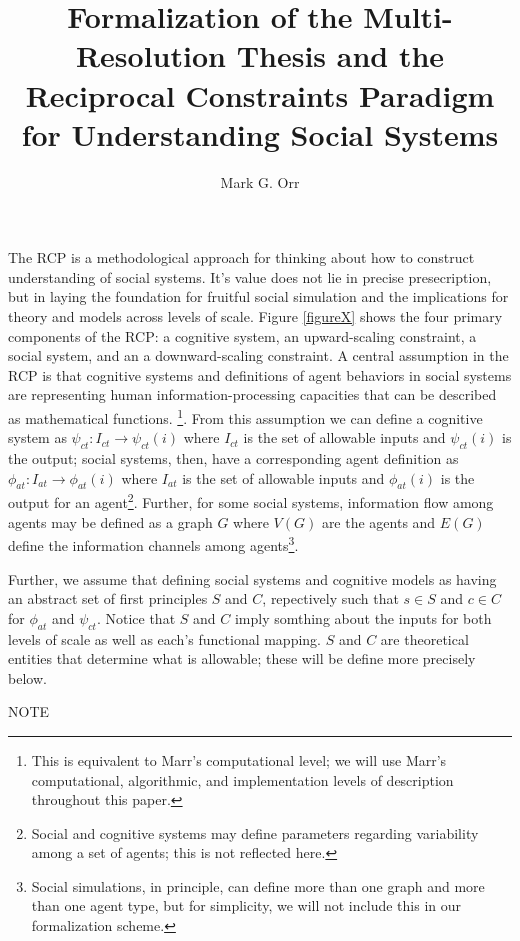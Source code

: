 \documentclass{article}
\title{Formalization of the Multi-Resolution Thesis and the Reciprocal Constraints Paradigm for Understanding Social Systems}
\author{Mark G. Orr}
\begin{document}
\maketitle
The RCP is a methodological approach for thinking about how to construct understanding of social systems.  It's value does not lie in precise presecription, but in laying the foundation for fruitful social simulation and the implications for theory and models across levels of scale.  Figure \ref{figureX} shows the four primary components of the RCP: a cognitive system, an upward-scaling constraint, a social system, and an a downward-scaling constraint. A central assumption in the RCP is that cognitive systems and definitions of agent behaviors in social systems are representing human information-processing capacities that can be described as mathematical functions. \cite{van Rooij, 2008}\footnote{This is equivalent to Marr's computational level; we will use Marr's computational, algorithmic, and implementation levels of description\cite{Marr,1981} throughout this paper.}. From this assumption we can define a cognitive system as $\psi_{ct}: I_{ct} \rightarrow \psi_{ct}(i)$ where $I_{ct}$ is the set of allowable inputs and $\psi_{ct}(i)$ is the output; social systems, then, have a corresponding agent definition as $\phi_{at}: I_{at} \rightarrow \phi_{at}(i)$ where $I_{at}$ is the set of allowable inputs and $\phi_{at}(i)$ is the output for an agent\footnote{Social and cognitive systems may define parameters regarding variability among a set of agents; this is not reflected here.}.  Further, for some social systems, information flow among agents may be defined as a graph $G$ where $V(G)$ are the agents and $E(G)$ define the information channels among agents\footnote{Social simulations, in principle, can define more than one graph and more than one agent type, but for simplicity, we will not include this in our formalization scheme.}. 

Further, we assume that defining social systems and cognitive models as having an abstract set of first principles $S$ and $C$, repectively such that $s \in S$ and $c \in C$ for $\phi_{at}$ and $\psi_{ct}$. Notice that $S$ and $C$ imply somthing about the inputs for both levels of scale as well as each's functional mapping.  $S$ and $C$ are theoretical entities that determine what is allowable; these will be define more precisely below.  

NOTE
 

  
\end{document}
